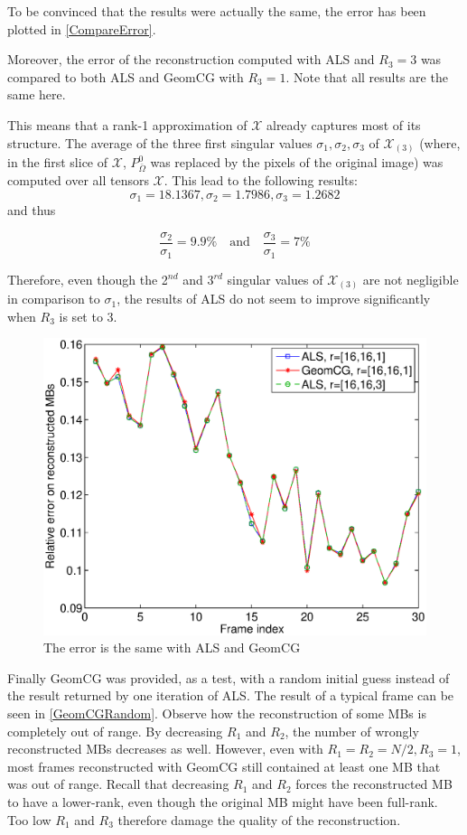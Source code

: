 \documentclass[a4paper, 11pt]{article} %
\def \be {\begin{equation*}}
\def \ee {\end{equation*}}
\def \X {\mathcal{X}}
\def \bO{\bar{\Omega}}
\begin{document}
To be convinced that the results were actually the same, the error has been plotted in \autoref{CompareError}. 

Moreover, the error of the reconstruction computed with ALS and $R_3=3$ was compared to both ALS and GeomCG with $R_3=1$.
Note that all results are the same here. 

This means that a rank-1 approximation of $\X$ already captures most of its structure. The average of the three first singular values $\sigma_1,\sigma_2, \sigma_3 $ of $\X_{(3)}$  (where, in the first slice of $\X$, $P^0_{\bO}$ was replaced by the pixels of the original image) was computed over all tensors $\X$. This lead to the following results:
\be
\sigma_1=18.1367, \sigma_2= 1.7986, \sigma_3=1.2682 
\ee
and thus 

\be
\frac{\sigma_2}{\sigma_1}=9.9\%\ \ \ \mbox{    and    }\ \ \ \frac{\sigma_3}{\sigma_1}=7\%
\ee

Therefore, even though the 2$^{nd}$ and 3$^{rd}$ singular values of $\X_{(3)}$ are not negligible in comparison  to $\sigma_1$, the results of ALS do not seem to improve significantly when $R_3$ is set to 3.
\begin{figure}[h!]
\centering
\includegraphics[scale=0.45]{CompareErrorNew}
\caption{The error is the same with ALS and GeomCG \label{CompareError}}
\end{figure}

Finally GeomCG was provided, as a test, with a random initial guess instead of the result returned by one iteration of ALS. The result of a typical frame can be seen in \autoref{GeomCGRandom}. Observe how the reconstruction of some MBs is completely out of range.
By decreasing $R_1$ and $R_2$, the number of wrongly reconstructed MBs decreases as well. However, even with $R_1=R_2=N/2, R_3=1$, most frames reconstructed with GeomCG still contained at least one MB that was out of range.
Recall that decreasing $R_1$ and $R_2$ forces the reconstructed MB to have a lower-rank, even though the original MB might have been full-rank. Too low $R_1$ and $R_3$ therefore damage the quality of the reconstruction.
\end{document}
